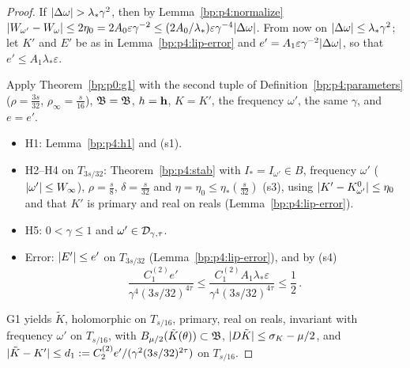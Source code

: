 \begin{proof}
\label{step:p4:lip-far}
If $\lvert \Delta\omega\rvert>\lambda_*\gamma^2$, then by Lemma~\ref{bp:p4:normalize}
$\lvert W_{\omega'}-W_\omega\rvert\le2\eta_0=2A_0\varepsilon\gamma^{-2}\le(2A_0/\lambda_*)\varepsilon\gamma^{-4}\lvert \Delta\omega\rvert$.
From now on $\lvert \Delta\omega\rvert\le\lambda_*\gamma^2$; let $K'$ and $E'$ be as in
Lemma~\ref{bp:p4:lip-error} and $e'=A_1\varepsilon\gamma^{-2}\lvert \Delta\omega\rvert$, so that
$e'\le A_1\lambda_*\varepsilon$.

\label{step:p4:lip-g1}
Apply Theorem~\ref{bp:p0:g1} with the second tuple of Definition~\ref{bp:p4:parameters}
($\rho=\frac{3s}{32}$, $\rho_\infty=\frac s{16}$), $\mathfrak B=\mathfrak{B}$, $h=\mathbf{h}$, $K=K'$, the
frequency $\omega'$, the same $\gamma$, and $e=e'$.
\begin{itemize}
\item H1: Lemma~\ref{bp:p4:h1} and (s1).
\item H2--H4 on $T_{3s/32}$: Theorem~\ref{bp:p4:stab} with $I_*=I_{\omega'}\in B$, frequency
  $\omega'$ ($\lvert \omega'\rvert\le W_\infty$), $\rho=\frac s8$, $\delta=\frac s{32}$ and $\eta=\eta_0\le\eta_*(\frac s{32})$
  (s3), using $\lvert K'-K^0_{\omega'}\rvert\le\eta_0$ and that $K'$ is primary and real on reals
  (Lemma~\ref{bp:p4:lip-error}).
\item H5: $0<\gamma\le1$ and $\omega'\in\mathcal{D}_{\gamma,\tau}$.
\item Error: $\lvert E'\rvert\le e'$ on $T_{3s/32}$ (Lemma~\ref{bp:p4:lip-error}), and by (s4)
  \begin{equation*}
  \frac{C_1^{(2)}e'}{\gamma^4(3s/32)^{4\tau}}\le\frac{C_1^{(2)}A_1\lambda_*\varepsilon}{\gamma^4(3s/32)^{4\tau}}\le\frac12\,.
  \end{equation*}
\end{itemize}
G1 yields $\tilde K$, holomorphic on $T_{s/16}$, primary, real on reals, invariant with frequency
$\omega'$ on $T_{s/16}$, with $B_{\mu/2}(\tilde K(\theta))\subset\mathfrak{B}$,
$\lvert D\tilde K\rvert\le\sigma_K-\mu/2$, and $\lvert \tilde K-K'\rvert\le d_1:=C_2^{(2)}e'/(\gamma^2(3s/32)^{2\tau})$
on $T_{s/16}$.


\end{proof}
